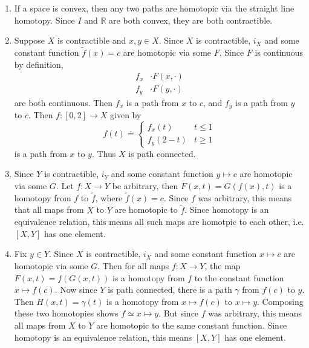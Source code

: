 \documentclass[10pt]{report}
\begin{document}
\begin{enumerate}
	\item If a space is convex, then any two paths are homotopic via the straight line homotopy. Since $I$ and $\mathbb{R}$ are both convex, they are both contractible.

	\item Suppose $X$ is contractible and $x,y \in X$. Since $X$ is contractible, $i_{X}$ and some constant function $\tilde{f}(x) = c$ are homotopic via some $F$. Since $F$ is continuous by definition,
		\begin{align*}
			f_{x} &\cdot F(x,\cdot) \\
			f_{y} &\cdot F(y,\cdot)
		\end{align*}
		are both continuous. Then $f_{x}$ is a path from $x$ to $c$, and $f_{y}$ is a path from $y$ to $c$. Then $f:[0,2]\to X$ given by
		\[
			f(t) \doteq
			\begin{cases}
				f_{x}(t) & t \leq 1 \\
				f_{y}(2-t) & t \geq 1
			\end{cases}
		\] is a path from $x$ to $y$. Thus $X$ is path connected.

	\item Since $Y$ is contractible, $i_{Y}$ and some constant function $y\mapsto c$ are homotopic via some $G$. Let $f:X\to Y$ be arbitrary, then $F(x,t) = G(f(x),t)$ is a homotopy from  $f$ to $\tilde{f}$, where $\tilde{f}(x)=c$. Since $f$ was arbitrary, this means that all maps from $X$ to $Y$ are homotopic to $\tilde{f}$. Since homotopy is an equivalence relation, this means all such maps are homotpic to each other, i.e. $[X,Y]$ has one element.

	\item Fix $y \in Y$. Since $X$ is contractible, $i_{X}$ and some constant function $x \mapsto c$ are homotopic via some $G$. Then for all maps $f:X\to Y$, the map $F(x,t) = f(G(x,t))$ is a homotopy from $f$ to the constant function $x \mapsto f(c)$. Now since $Y$ is path connected, there is a path $\gamma$ from $f(c)$ to $y$. Then $H(x,t) = \gamma(t)$ is a homotopy from $x \mapsto f(c)$ to $x \mapsto y$. Composing these two homotopies shows $f \simeq x \mapsto y$. But since $f$ was arbitrary, this means all maps from $X$ to $Y$ are homotopic to the same constant function. Since homotopy is an equivalence relation, this means $[X,Y]$ has one element.
\end{enumerate}
\end{document}
